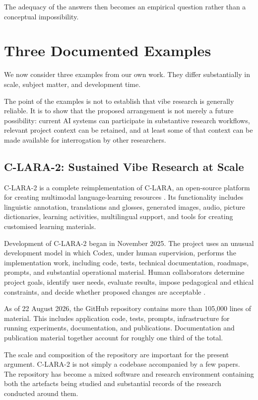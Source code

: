 The adequacy of the answers then becomes an empirical question rather than a conceptual impossibility.


\section{Three Documented Examples}

We now consider three examples from our own work. They differ substantially in scale, subject matter, and development time.

The point of the examples is not to establish that vibe research is generally reliable. It is to show that the proposed arrangement is not merely a future possibility: current AI systems can participate in substantive research workflows, relevant project context can be retained, and at least some of that context can be made available for interrogation by other researchers.


\subsection{C-LARA-2: Sustained Vibe Research at Scale}

C-LARA-2 is a complete reimplementation of C-LARA, an open-source platform for creating multimodal language-learning resources \citep{claraOriginal}. Its functionality includes linguistic annotation, translations and glosses, generated images, audio, picture dictionaries, learning activities, multilingual support, and tools for creating customised learning materials.

Development of C-LARA-2 began in November 2025. The project uses an unusual development model in which Codex, under human supervision, performs the implementation work, including code, tests, technical documentation, roadmaps, prompts, and substantial operational material. Human collaborators determine project goals, identify user needs, evaluate results, impose pedagogical and ethical constraints, and decide whether proposed changes are acceptable \citep{bediEtAl2026clara2}.

As of 22 August 2026, the GitHub repository contains more than 105,000 lines of material. This includes application code, tests, prompts, infrastructure for running experiments, documentation, and publications. Documentation and publication material together account for roughly one third of the total.

The scale and composition of the repository are important for the present argument. C-LARA-2 is not simply a codebase accompanied by a few papers. The repository has become a mixed software and research environment containing both the artefacts being studied and substantial records of the research conducted around them.

